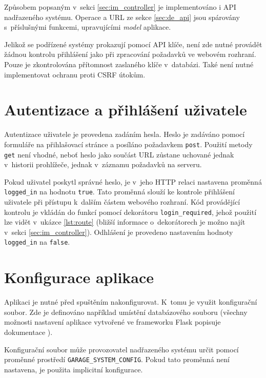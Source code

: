 Způsobem popsaným v~sekci \ref{sec:im_controller} je implementováno i API nadřazeného systému. Operace a URL ze sekce \ref{sec:de_api} jsou spárovány s~příslušnými funkcemi, upravujícími \textit{model} aplikace.

Jelikož se podřízené systémy prokazují pomocí API klíče, není zde nutné provádět žádnou kontrolu přihlášení jako při zpracování požadavků ve webovém rozhraní. Pouze je zkontrolována přítomnost zaslaného klíče v~databázi. Také není nutné implementovat ochranu proti CSRF útokům.

\section{Autentizace a přihlášení uživatele}
\label{sec:im_auth}

Autentizace uživatele je provedena zadáním hesla. Heslo je zadáváno pomocí formuláře na přihlašovací stránce a posíláno požadavkem \texttt{post}. Použití metody \texttt{get} není vhodné, neboť heslo jako součást URL zůstane uchované jednak v~historii prohlížeče, jednak v~záznamu požadavků na serveru.

Pokud uživatel poskytl správné heslo, je v~jeho HTTP relaci nastavena proměnná \texttt{logged\_in} na hodnotu \texttt{true}. Tato proměnná slouží ke kontrole přihlášení uživatele při přístupu k~dalším částem webového rozhraní. Kód provádějící kontrolu je vkládán do funkcí pomocí dekorátoru \texttt{login\_required}, jehož použití lze vidět v~ukázce \ref{lst:route} (bližší informace o~dekorátorech je možno najít v~sekci \ref{sec:im_controller}). Odhlášení je provedeno nastavením hodnoty \texttt{logged\_in} na \texttt{false}.



\section{Konfigurace aplikace}
\label{sec:im_config}

Aplikaci je nutné před spuštěním nakonfigurovat. K~tomu je využit konfigurační soubor. Zde je definováno například umístění databázového souboru (všechny možnosti nastavení aplikace vytvořené ve frameworku Flask popisuje dokumentace \cite{flask_config}).

Konfigurační soubor může provozovatel nadřazeného systému určit pomocí proměnné prostředí \texttt{GARAGE\_SYSTEM\_CONFIG}. Pokud tato proměnná není nastavena, je použita implicitní konfigurace.